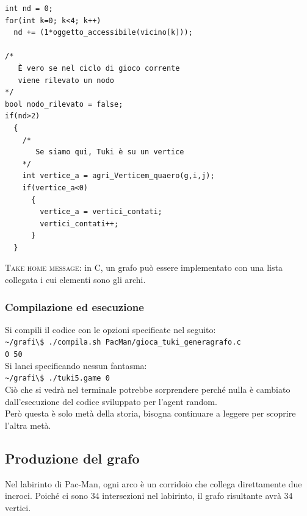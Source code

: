 \documentclass[8pt]{book}
\begin{document}
\begin{spacing}{0.9}
  \begin{small}
    \begin{tcolorbox}
\begin{verbatim}
int nd = 0;
for(int k=0; k<4; k++)
  nd += (1*oggetto_accessibile(vicino[k]));

/* 
   È vero se nel ciclo di gioco corrente 
   viene rilevato un nodo 
*/
bool nodo_rilevato = false;
if(nd>2)
  {
    /* 
       Se siamo qui, Tuki è su un vertice 
    */
    int vertice_a = agri_Verticem_quaero(g,i,j);
    if(vertice_a<0)
      {
        vertice_a = vertici_contati;
        vertici_contati++;
      }    
  }
\end{verbatim}
    \end{tcolorbox}
  \end{small}
\end{spacing}

\textsc{Take home message:} in C, un grafo può essere implementato con una lista collegata i cui elementi sono gli archi.

\subsubsection{Compilazione ed esecuzione}

Si compili il codice con le opzioni specificate nel seguito:\\

\texttt{\textasciitilde{}/grafi\textbackslash{}\$ ./compila.sh PacMan/gioca\_tuki\_generagrafo.c\\ 0 50}\\

Si lanci specificando nessun fantasma:\\

\texttt{\textasciitilde{}/grafi\textbackslash{}\$ ./tuki5.game 0}\\

Ciò che si vedrà nel terminale potrebbe sorprendere perché nulla è cambiato dall'esecuzione del codice sviluppato per l'agent random.\\
Però questa è solo metà della storia, bisogna continuare a leggere per scoprire l'altra metà.

\subsection{Produzione del grafo}\label{tocux5f41}

Nel labirinto di Pac-Man, ogni arco è un corridoio che collega direttamente due incroci. Poiché ci sono 34 intersezioni nel labirinto, il grafo risultante avrà 34 vertici.
\end{document}
